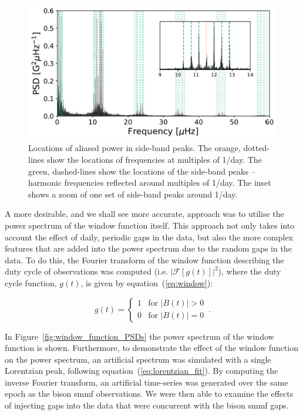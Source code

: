 \begin{figure}[ht!]
	\centering
	\includegraphics[width=\columnwidth]{sideband.pdf}
	\caption{Locations of aliased power in side-band peaks. The orange, dotted-lines show the locations of frequencies at multiples of 1/day. The green, dashed-lines show the locations of the side-band peaks -- harmonic frequencies reflected around multiples of 1/day.  The inset shows a zoom of one set of side-band peaks around 1/day.}
	\label{fig:sideband_locations}
\end{figure}


A more desirable, and we shall see more accurate, approach was to utilise the power spectrum of the window function itself. This approach not only takes into account the effect of daily, periodic gaps in the data, but also the more complex features that are added into the power spectrum due to the random gaps in the data. To do this, the Fourier transform of the window function describing the duty cycle of observations was computed (i.e. $\left|\mathcal{F}\left[g(t)\right]\right|^2$), where the duty cycle function, $g(t)$, is given by equation~(\ref{eq:window}):

\begin{equation}
g(t) = 
\begin{cases} 
1 & \text{for } |B(t)| > 0 \\
0       & \text{for } |B(t)| = 0
\end{cases} \, .
\label{eq:window}
\end{equation}

In Figure~\ref{fig:window_function_PSDs} the power spectrum of the window function is shown. Furthermore, to demonstrate the effect of the window function on the power spectrum, an artificial spectrum was simulated with a single Lorentzian peak, following equation~(\ref{eq:lorentzian_fit}). By computing the inverse Fourier transform, an artificial time-series was generated over the same epoch as the \gls{bison} \gls{smmf} observations. We were then able to examine the effects of injecting gaps into the data that were concurrent with the \gls{bison} \gls{smmf} gaps. 

